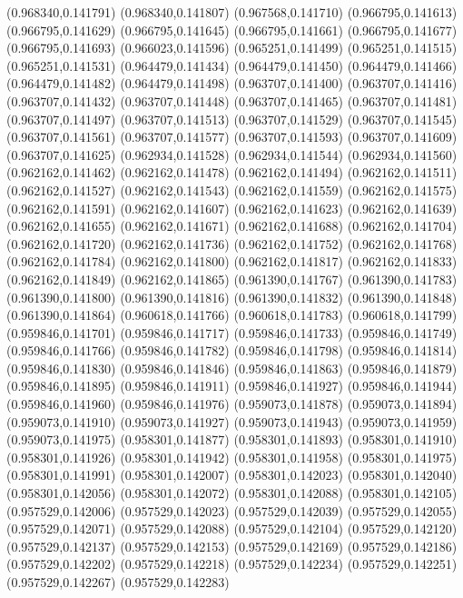 (0.968340,0.141791)
(0.968340,0.141807)
(0.967568,0.141710)
(0.966795,0.141613)
(0.966795,0.141629)
(0.966795,0.141645)
(0.966795,0.141661)
(0.966795,0.141677)
(0.966795,0.141693)
(0.966023,0.141596)
(0.965251,0.141499)
(0.965251,0.141515)
(0.965251,0.141531)
(0.964479,0.141434)
(0.964479,0.141450)
(0.964479,0.141466)
(0.964479,0.141482)
(0.964479,0.141498)
(0.963707,0.141400)
(0.963707,0.141416)
(0.963707,0.141432)
(0.963707,0.141448)
(0.963707,0.141465)
(0.963707,0.141481)
(0.963707,0.141497)
(0.963707,0.141513)
(0.963707,0.141529)
(0.963707,0.141545)
(0.963707,0.141561)
(0.963707,0.141577)
(0.963707,0.141593)
(0.963707,0.141609)
(0.963707,0.141625)
(0.962934,0.141528)
(0.962934,0.141544)
(0.962934,0.141560)
(0.962162,0.141462)
(0.962162,0.141478)
(0.962162,0.141494)
(0.962162,0.141511)
(0.962162,0.141527)
(0.962162,0.141543)
(0.962162,0.141559)
(0.962162,0.141575)
(0.962162,0.141591)
(0.962162,0.141607)
(0.962162,0.141623)
(0.962162,0.141639)
(0.962162,0.141655)
(0.962162,0.141671)
(0.962162,0.141688)
(0.962162,0.141704)
(0.962162,0.141720)
(0.962162,0.141736)
(0.962162,0.141752)
(0.962162,0.141768)
(0.962162,0.141784)
(0.962162,0.141800)
(0.962162,0.141817)
(0.962162,0.141833)
(0.962162,0.141849)
(0.962162,0.141865)
(0.961390,0.141767)
(0.961390,0.141783)
(0.961390,0.141800)
(0.961390,0.141816)
(0.961390,0.141832)
(0.961390,0.141848)
(0.961390,0.141864)
(0.960618,0.141766)
(0.960618,0.141783)
(0.960618,0.141799)
(0.959846,0.141701)
(0.959846,0.141717)
(0.959846,0.141733)
(0.959846,0.141749)
(0.959846,0.141766)
(0.959846,0.141782)
(0.959846,0.141798)
(0.959846,0.141814)
(0.959846,0.141830)
(0.959846,0.141846)
(0.959846,0.141863)
(0.959846,0.141879)
(0.959846,0.141895)
(0.959846,0.141911)
(0.959846,0.141927)
(0.959846,0.141944)
(0.959846,0.141960)
(0.959846,0.141976)
(0.959073,0.141878)
(0.959073,0.141894)
(0.959073,0.141910)
(0.959073,0.141927)
(0.959073,0.141943)
(0.959073,0.141959)
(0.959073,0.141975)
(0.958301,0.141877)
(0.958301,0.141893)
(0.958301,0.141910)
(0.958301,0.141926)
(0.958301,0.141942)
(0.958301,0.141958)
(0.958301,0.141975)
(0.958301,0.141991)
(0.958301,0.142007)
(0.958301,0.142023)
(0.958301,0.142040)
(0.958301,0.142056)
(0.958301,0.142072)
(0.958301,0.142088)
(0.958301,0.142105)
(0.957529,0.142006)
(0.957529,0.142023)
(0.957529,0.142039)
(0.957529,0.142055)
(0.957529,0.142071)
(0.957529,0.142088)
(0.957529,0.142104)
(0.957529,0.142120)
(0.957529,0.142137)
(0.957529,0.142153)
(0.957529,0.142169)
(0.957529,0.142186)
(0.957529,0.142202)
(0.957529,0.142218)
(0.957529,0.142234)
(0.957529,0.142251)
(0.957529,0.142267)
(0.957529,0.142283)
